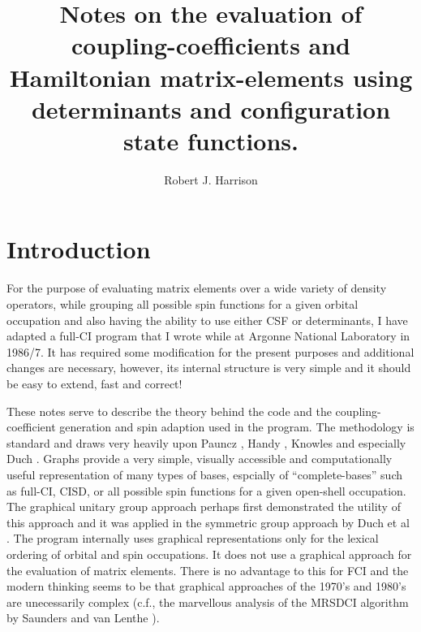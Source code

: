 



\newcommand{\RN}[1]{\underline{r}_{#1}}
\newcommand{\nCr}[2]{\left(\begin{array}{c} #1 \\ #2 \end{array}\right)}
\newcommand{\half}{\frac{1}{2}}

\title{Notes on the evaluation of coupling-coefficients and Hamiltonian matrix-elements using determinants and configuration state functions.}

\author{Robert J. Harrison}

\date{}


\maketitle

\clearpage

\tableofcontents

\clearpage

\section{Introduction}

For the purpose of evaluating matrix elements over a wide variety of
density operators, while grouping all possible spin functions for a
given orbital occupation and also having the ability to use either CSF
or determinants, I have adapted a full-CI program that I wrote while at
Argonne National Laboratory in 1986/7.  It has required some
modification for the present purposes and additional changes are
necessary, however, its internal structure is very simple and it
should be easy to extend, fast and correct!

These notes serve to describe the theory behind the code and the
coupling-coefficient generation and spin adaption used in the program.
The methodology is standard and draws very heavily upon Pauncz
\cite{pauncz,paunczsym}, Handy \cite{handyfci}, Knowles
\cite{knowleseai} and especially Duch
\cite{duchug,duchspinad,duchcouple,duchfci,duchsga}.  Graphs provide a
very simple, visually accessible and computationally useful
representation of many types of bases, espcially of ``complete-bases''
such as full-CI, CISD, or all possible spin functions for a given
open-shell occupation.  The graphical unitary group approach
\cite{paldusguga,shavittguga,shavittguga2} perhaps first demonstrated
the utility of this approach and it was applied in the symmetric group
approach by Duch et al \cite{duchsga}.  The program internally uses
graphical representations only for the lexical ordering of orbital and
spin occupations.  It does not use a graphical approach for the
evaluation of matrix elements.  There is no advantage to this for FCI
and the modern thinking seems to be that graphical approaches of the
1970's and 1980's are unecessarily complex (c.f., the marvellous
analysis of the MRSDCI algorithm by Saunders and van Lenthe
\cite{saunders}).

